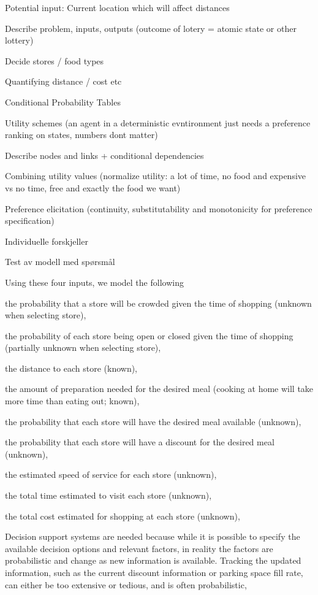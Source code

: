 Potential input: Current location which will affect distances

Describe problem, inputs, outputs (outcome of lotery = atomic state or other lottery)

Decide stores / food types

Quantifying distance / cost etc 

Conditional Probability Tables

Utility schemes (an agent in a deterministic evntironment just needs a preference ranking on states, numbers dont matter)

Describe nodes and links + conditional dependencies

Combining utility values (normalize utility: a lot of time, no food and expensive vs no time, free and exactly the food we want)

Preference elicitation (continuity, substitutability and monotonicity for preference specification)

Individuelle forskjeller

Test av modell med spørsmål


Using these four inputs, we model the following
\begin{enumerate*}[label=\alph*)]
\item the probability that a store will be crowded given the time of shopping (unknown when selecting store),
\item the probability of each store being open or closed given the time of shopping (partially unknown when selecting store),
\item the distance to each store (known),
\item the amount of preparation needed for the desired meal (cooking at home will take more time than eating out; known),
\item the probability that each store will have the desired meal available (unknown),
\item the probability that each store will have a discount for the desired meal (unknown),
\item the estimated speed of service for each store (unknown),
\item the total time estimated to visit each store (unknown),
\item the total cost estimated for shopping at each store (unknown),
\end{enumerate*}



Decision support systems are needed because while it is possible to specify the available decision options and relevant factors, in reality the factors are probabilistic and change as new information is available. Tracking the updated information, such as the current discount information or parking space fill rate, can either be too extensive or tedious, and is often probabilistic,

